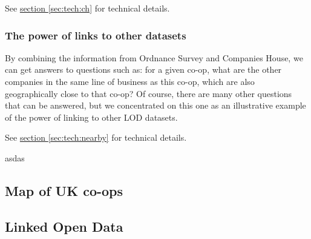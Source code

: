 \documentclass[11pt,twoside,a4paper]{article}
\begin{document}
See \hyperref[sec:tech:ch]{section \ref{sec:tech:ch}} for technical details.

\subsubsection{The power of links to other datasets}

By combining the information from Ordnance Survey and Companies House, 
we can get answers to questions such as: 
for a given co-op, what are the other companies in the same line of business as this co-op, which are also geographically close to that co-op?
Of course, there are many other questions that can be answered,
but we concentrated on this one as an illustrative example of the power of linking to other LOD datasets.

See \hyperref[sec:tech:nearby]{section \ref{sec:tech:nearby}} for technical details.

asdas
\subsection{Map of UK co-ops}
\subsection{Linked Open Data}
\end{document}
